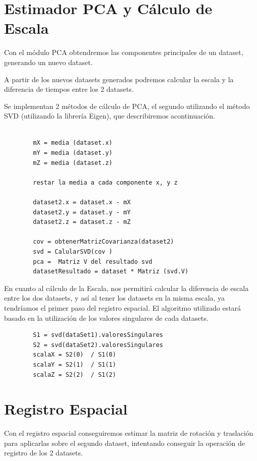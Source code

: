 \section{Estimador PCA y Cálculo de Escala}

	Con el módulo PCA obtendremos las componentes principales de un dataset, generando un nuevo dataset.

	A partir de los nuevos datasets generados podremos calcular la escala y la diferencia de tiempos entre los 2 datasets.

	Se implementan 2 métodos de cálculo de PCA, el segundo utilizando el método SVD (utilizando la librería Eigen), que describiremos acontinuación.

	\begin{lstlisting}
		
		mX = media (dataset.x)
		mY = media (dataset.y)
		mZ = media (dataset.z)

		restar la media a cada componente x, y z

		dataset2.x = dataset.x - mX
		dataset2.y = dataset.y - mY
		dataset2.z = dataset.z - mZ

		cov = obtenerMatrizCovarianza(dataset2)
		svd = CalularSVD(cov )
		pca =  Matriz V del resultado svd
		datasetResultado = dataset * Matriz (svd.V)

	\end{lstlisting}

    En cuanto al cálculo de la Escala, nos permitirá calcular la diferencia de escala entre los dos datasets, y así al tener los datasets en la misma escala, ya tendríamos el primer paso del registro espacial. El algoritmo utilizado estará basado en la utilización de los valores singulares de cada datasets.
        
	\begin{lstlisting}
		S1 = svd(dataSet1).valoresSingulares
		S2 = svd(dataSet2).valoresSingulares
		scalaX = S2(0)  / S1(0)
		scalaY = S2(1)  / S1(1)
		scalaZ = S2(2)  / S1(2)
	\end{lstlisting}

\section{Registro Espacial}

Con el registro espacial conseguiremos estimar la matriz de rotación y traslación para aplicarlas sobre el segundo dataset, intentando conseguir la operación de registro de los 2 datasets.



